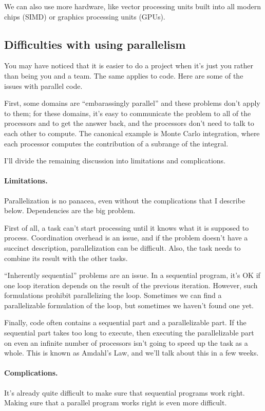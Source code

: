 \documentclass[a4paper]{report}
\begin{document}
We can also use more hardware, like vector processing units built into all modern
chips (SIMD) or graphics processing units (GPUs).

\subsection*{Difficulties with using parallelism}
You may have noticed that it is easier to do a project when it's just
you rather than being you and a team. The same applies to code.
Here are some of the issues with parallel code.

First, some domains are ``embarassingly parallel'' and these problems
don't apply to them; for these domains, it's easy to communicate
the problem to all of the processors and to get the answer back, and
the processors don't need to talk to each other to compute. The canonical
example is Monte Carlo integration, where each processor computes the
contribution of a subrange of the integral.

I'll divide the remaining discussion into limitations and complications.

\paragraph{Limitations.} Parallelization is no panacea, even without
the complications that I describe below. Dependencies are the
big problem.

First of all, a task can't start processing until it knows what it
is supposed to process. Coordination overhead is an issue, and if the
problem doesn't have a succinct description, parallelization can be
difficult. Also, the task needs to combine its result with the other
tasks.

``Inherently sequential'' problems are an issue. In a sequential 
program, it's OK if one loop iteration depends on the result of the
previous iteration. However, such formulations prohibit parallelizing
the loop. Sometimes we can find a parallelizable formulation of the loop,
but sometimes we haven't found one yet.

Finally, code often contains a sequential part and a parallelizable
part.  If the sequential part takes too long to execute, then
executing the parallelizable part on even an infinite number of
processors isn't going to speed up the task as a whole. This is
known as Amdahl's Law, and we'll talk about this in a few weeks.

\paragraph{Complications.} It's already quite difficult to make sure that
sequential programs work right. Making sure that a parallel program
works right is even more difficult.
\end{document}
